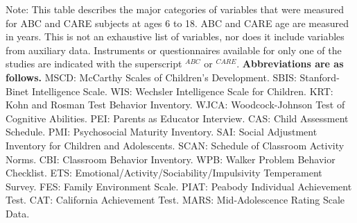 \begin{sidewaystable}[H]
\begin{threeparttable}
\begin{tablenotes}
\item Note: This table describes the major categories of variables that were measured for ABC and CARE subjects at ages 6 to 18. ABC and CARE age are measured in years. This is not an exhaustive list of variables, nor does it include variables from auxiliary data.  Instruments or questionnaires available for only one of the studies are indicated with the superscript $^{ABC}$ or $^{CARE}$. \textbf{Abbreviations are as follows.}  MSCD: McCarthy Scales of Children's Development. SBIS: Stanford-Binet Intelligence Scale. WIS: Wechsler Intelligence Scale for Children. KRT: Kohn and Rosman Test Behavior Inventory. WJCA: Woodcock-Johnson Test of Cognitive Abilities. PEI: Parents as Educator Interview. CAS: Child Assessment Schedule. PMI: Psychosocial Maturity Inventory. SAI: Social Adjustment Inventory for Children and Adolescents. SCAN: Schedule of Classroom Activity Norms. CBI: Classroom Behavior Inventory. WPB: Walker Problem Behavior Checklist. ETS: Emotional/Activity/Sociability/Impulsivity Temperament Survey. FES: Family Environment Scale. PIAT: Peabody Individual Achievement Test. CAT: California Achievement Test. MARS: Mid-Adolescence Rating Scale Data.
\end{tablenotes}
\end{threeparttable}
\end{sidewaystable}

